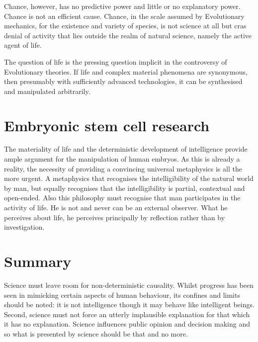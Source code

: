 \documentclass{article}
\begin{document}
Chance, however, has no predictive power and little or no explanatory power. Chance is not an efficient cause. Chance, in the scale assumed by Evolutionary mechanics, for the existence and variety of species, is not science at all but cras denial of activity that lies outside the realm of natural science, namely the active agent of life.

The question of life is the pressing question implicit in the controversy of Evolutionary theories. If life and complex material phenomena are synonymous, then presumably with sufficiently advanced technologies, it can be synthesised and manipulated arbitrarily.

\section*{Embryonic stem cell research}
The materiality of life and the deterministic development of intelligence provide ample argument for the manipulation of human embryos. As this is already a reality, the necessity of providing a convincing universal metaphysics is all the more urgent. A metaphysics that recognises the intelligibility of the natural world by man, but equally recognises that the intelligibility is partial, contextual and open-ended. Also this philosophy must recognise that man participates in the activity of life. He is not and never can be an external observer. What he perceives about life, he perceives principally by reflection rather than by investigation.

\section*{Summary}
Science must leave room for non-deterministic causality. Whilst progress has been seen in mimicking certain aspects of human behaviour, its confines and limits should be noted: it is not intelligence though it may behave like intelligent beings. Second, science must not force an utterly implausible explanation for that which it has no explanation. Science influences public opinion and decision making and so what is presented by science should be that and no more.
\end{document}
